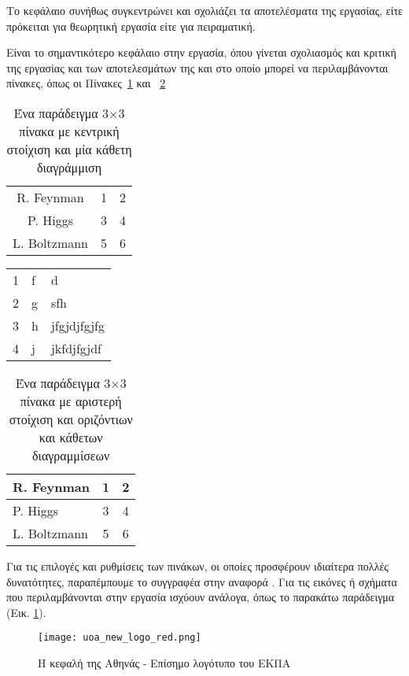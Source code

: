 Το κεφάλαιο συνήθως συγκεντρώνει και σχολιάζει
τα αποτελέσματα της εργασίας, είτε πρόκειται για θεωρητική εργασία
είτε για πειραματική.

Είναι το σημαντικότερο κεφάλαιο στην εργασία, όπου γίνεται σχολιασμός
και κριτική της εργασίας και των αποτελεσμάτων της και στο οποίο μπορεί
να περι\-λαμβάνονται πίνακες, όπως οι Πίνακες~\ref{tab:no1} και ~\ref{tab:no2}

\begin{table}[ht]
\centering
\begin{tabular}{c|cc}
R. Feynman & 1 & 2 \\
P. Higgs & 3 & 4 \\
L. Boltzmann & 5 & 6
\end{tabular}
\caption{Ένα παράδειγμα 3$\times$3 πίνακα με κεντρική στοίχιση και μία κάθετη διαγράμμιση}
\label{tab:no1}
\end{table}

\begin{table}
    \begin{tabular}{lll}
    1 & f & d           \\
    2 & g & sfh         \\
    3 & h & jfgjdjfgjfg \\
    4 & j & jkfdjfgjdf  \\
    \end{tabular}
\end{table}

\begin{table}[ht]
\centering
\begin{tabular}{l|cc}
R. Feynman & 1 & 2 \\\hline
P. Higgs & 3 & 4 \\\hline
L. Boltzmann & 5 & 6
\end{tabular}
\caption{Ένα παράδειγμα 3$\times$3 πίνακα με αριστερή στοίχιση και οριζόντιων και κάθετων διαγραμμίσεων}
\label{tab:no2}
\end{table}

Για τις επιλογές και ρυθμίσεις των πινάκων, οι οποίες προσφέρουν ιδιαίτερα
πολλές δυνατότητες, παραπέμπουμε το συγγραφέα στην αναφορά \cite{wiki_latex}.
Για τις εικόνες ή σχήματα που περιλαμβάνονται
στην εργασία ισχύουν ανάλογα, όπως το παρακάτω παράδειγμα (Εικ. \ref{fig:uoa_logo}).

\begin{figure}[ht]
\centering
\texttt{[image: uoa\_new\_logo\_red.png]}
\caption{Η κεφαλή της Αθηνάς - Επίσημο λογότυπο του ΕΚΠΑ}
\label{fig:uoa_logo}
\end{figure}